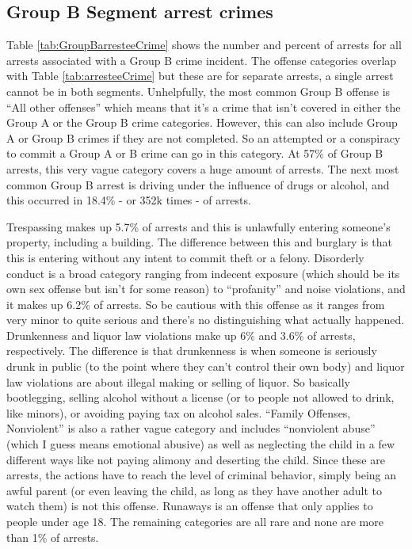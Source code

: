 \documentclass[
  12pt,
  openany]{book}
\begin{document}
\subsection{Group B Segment arrest crimes}\label{group-b-segment-arrest-crimes}

Table \ref{tab:GroupBarresteeCrime} shows the number and percent of arrests for all arrests associated with a Group B crime incident. The offense categories overlap with Table \ref{tab:arresteeCrime} but these are for separate arrests, a single arrest cannot be in both segments. Unhelpfully, the most common Group B offense is ``All other offenses'' which means that it's a crime that isn't covered in either the Group A or the Group B crime categories. However, this can also include Group A or Group B crimes if they are not completed. So an attempted or a conspiracy to commit a Group A or B crime can go in this category. At 57\% of Group B arrests, this very vague category covers a huge amount of arrests. The next most common Group B arrest is driving under the influence of drugs or alcohol, and this occurred in 18.4\% - or 352k times - of arrests.

Trespassing makes up 5.7\% of arrests and this is unlawfully entering someone's property, including a building. The difference between this and burglary is that this is entering without any intent to commit theft or a felony. Disorderly conduct is a broad category ranging from indecent exposure (which should be its own sex offense but isn't for some reason) to ``profanity'' and noise violations, and it makes up 6.2\% of arrests. So be cautious with this offense as it ranges from very minor to quite serious and there's no distinguishing what actually happened. Drunkenness and liquor law violations make up 6\% and 3.6\% of arrests, respectively. The difference is that drunkenness is when someone is seriously drunk in public (to the point where they can't control their own body) and liquor law violations are about illegal making or selling of liquor. So basically bootlegging, selling alcohol without a license (or to people not allowed to drink, like minors), or avoiding paying tax on alcohol sales. ``Family Offenses, Nonviolent'' is also a rather vague category and includes ``nonviolent abuse'' (which I guess means emotional abusive) as well as neglecting the child in a few different ways like not paying alimony and deserting the child. Since these are arrests, the actions have to reach the level of criminal behavior, simply being an awful parent (or even leaving the child, as long as they have another adult to watch them) is not this offense. Runaways is an offense that only applies to people under age 18. The remaining categories are all rare and none are more than 1\% of arrests.
\end{document}
